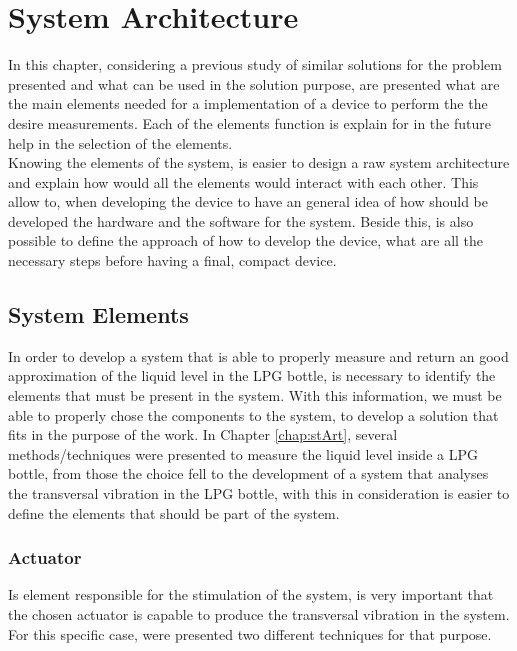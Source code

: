 \cleardoublepage
\chapter{System Architecture} \label{chap:sysArch}
In this chapter, considering a previous study of similar solutions for the problem presented and what can be used in the solution purpose, are presented what are the main elements needed for a implementation of a device to perform the the desire measurements. Each of the elements function is explain for in the future help in the selection of the elements.\\
Knowing the elements of the system, is easier to design a raw system architecture and explain how would all the elements would interact with each other. This allow to, when developing the device to have an general idea of how should be developed the hardware and the software for the system. Beside this, is also possible to define the approach of how to develop the device, what are all the necessary steps before having a final, compact device. 

\section{System Elements}
In order to develop a system that is able to properly measure and return an good approximation of the liquid level in the LPG bottle, is necessary to identify the elements that must be present in the system. With this information, we must be able to properly chose the components to the system, to develop a solution that fits in the purpose of the work. In Chapter \ref{chap:stArt}, several methods/techniques were presented to measure the liquid level inside a LPG bottle, from those the choice fell to the development of a system that analyses the transversal vibration in the LPG bottle, with this in consideration is easier to define the elements that should be part of the system. 
\subsection*{Actuator}
Is element  responsible for the stimulation of the system, is very important that the chosen actuator is capable to produce the transversal vibration in the system. For this specific case, were presented two different techniques for that purpose.
